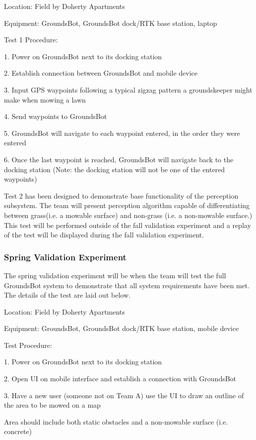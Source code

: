 \documentclass{article}
\begin{document}
Location: Field by Doherty Apartments

Equipment: GroundsBot, GroundsBot dock/RTK base station, laptop

Test 1 Procedure:

1. Power on GroundsBot next to its docking station

2. Establish connection between GroundsBot and mobile device

3. Input GPS waypoints following a typical zigzag pattern a groundskeeper might make when mowing a lawn

4. Send waypoints to GroundsBot

5. GroundsBot will navigate to each waypoint entered, in the order they were entered

6. Once the last waypoint is reached, GroundsBot will navigate back to the docking station (Note: the docking station will not be one of the entered waypoints)

Test 2 has been designed to demonstrate base functionality of the perception subsystem. The team will present perception algorithm capable of differentiating between grass(i.e. a mowable surface) and non-grass (i.e. a non-mowable surface.) This test will be performed outside of the fall validation experiment and a replay of the test will be displayed during the fall validation experiment.

\subsubsection{Spring Validation Experiment}

	The spring validation experiment will be when the team will test the full GroundsBot system to demonstrate that all system requirements have been met. The details of the test are laid out below.
	
Location: Field by Doherty Apartments

Equipment: GroundsBot, GroundsBot dock/RTK base station, mobile device

Test Procedure:

1. Power on GroundsBot next to its docking station

2. Open UI on mobile interface and establish a connection with GroundsBot

3. Have a new user (someone not on Team A) use the UI to draw an outline of the area to be mowed on a map

	Area should include both static obstacles and a non-mowable surface (i.e. concrete)
	
\end{document}
